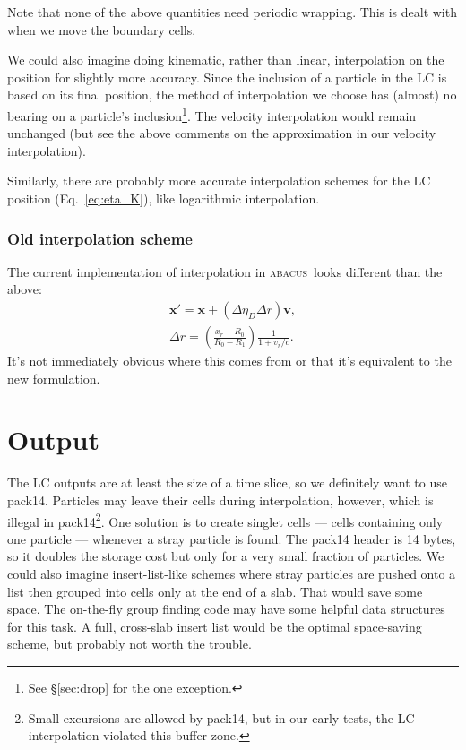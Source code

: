\documentclass[a4paper]{article}
\newcommand{\abacus}{\textsc{abacus}\xspace}
\newcommand{\bfx}{\ensuremath{\mathbf{x}}}
\newcommand{\bfv}{\ensuremath{\mathbf{v}}}
\begin{document}
Note that none of the above quantities need periodic wrapping.  This is dealt with when we move the boundary cells.

We could also imagine doing kinematic, rather than linear, interpolation on the position for slightly more accuracy.  Since the inclusion of a particle in the LC is based on its final position, the method of interpolation we choose has (almost) no bearing on a particle's inclusion\footnote{See \S \ref{sec:drop} for the one exception.}.  The velocity interpolation would remain unchanged (but see the above comments on the approximation in our velocity interpolation).

Similarly, there are probably more accurate interpolation schemes for the LC position (Eq.~\ref{eq:eta_K}), like logarithmic interpolation.

\subsubsection{Old interpolation scheme}
The current implementation of interpolation in \abacus\ looks different than the above:
\begin{gather}
\bfx' = \bfx + (\Delta\eta_D\Delta r) \bfv, \\
\Delta r = \left(\frac{x_r - R_0}{R_0 - R_1}\right)\frac{1}{1 + v_r/c}.
\end{gather}
It's not immediately obvious where this comes from or that it's equivalent to the new formulation.

\section{Output}
The LC outputs are at least the size of a time slice, so we definitely want to use pack14.  Particles may leave their cells during interpolation, however, which is illegal in pack14\footnote{Small excursions are allowed by pack14, but in our early tests, the LC interpolation violated this buffer zone.}.  One solution is to create singlet cells --- cells containing only one particle --- whenever a stray particle is found.  The pack14 header is 14 bytes, so it doubles the storage cost but only for a very small fraction of particles.  We could also imagine insert-list-like schemes where stray particles are pushed onto a list then grouped into cells only at the end of a slab.  That would save some space.  The on-the-fly group finding code may have some helpful data structures for this task.  A full, cross-slab insert list would be the optimal space-saving scheme, but probably not worth the trouble.
\end{document}
